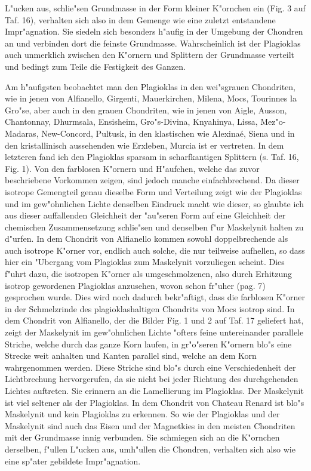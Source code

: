 \documentclass[a4paper, 11pt, oneside, polutonikogreek, german]{article}
\begin{document}
L"ucken aus, schlie"sen Grundmasse in der Form kleiner K"ornchen ein (Fig. 3 auf Taf. 16), verhalten sich also in dem Gemenge wie eine zuletzt entstandene Impr"agnation. Sie siedeln sich besonders h"aufig in der Umgebung der Chondren an und verbinden dort die feinste Grundmasse. Wahrscheinlich ist der Plagioklas auch unmerklich zwischen den K"ornern und Splittern der Grundmasse verteilt und bedingt zum Teile die Festigkeit des Ganzen.

Am h"aufigsten beobachtet man den Plagioklas in den wei"sgrauen Chondriten, wie in jenen von Alfianello, Girgenti, Mauerkirchen, Milena, Mocs, Tourinnes la Gro"se, aber auch in den grauen Chondriten, wie in jenen von Aigle, Ausson, Chantonnay, Dhurmsala, Ensisheim, Gro"s-Divina, Knyahinya, Lissa, Mez"o-Madaras, New-Concord, Pultusk, in den klastischen wie Alexinaé, Siena und in den kristallinisch aussehenden wie Erxleben, Murcia ist er vertreten. In dem letzteren fand ich den Plagioklas sparsam in scharfkantigen Splittern (s. Taf. 16, Fig. 1). Von den farblosen K"ornern und H"aufchen, welche das zuvor beschriebene Vorkommen zeigen, sind jedoch manche einfachbrechend. Da dieser isotrope Gemengteil genau dieselbe Form und Verteilung zeigt wie der Plagioklas und im gew"ohnlichen Lichte denselben Eindruck macht wie dieser, so glaubte ich aus dieser auffallenden Gleichheit der "au"seren Form auf eine Gleichheit der chemischen Zusammensetzung schlie"sen und denselben f"ur Maskelynit halten zu d"urfen. In dem Chondrit von Alfianello kommen sowohl doppelbrechende als auch isotrope K"orner vor, endlich auch solche, die nur teilweise aufhellen, so dass hier ein "Ubergang vom Plagioklas zum Maskelynit vorzuliegen scheint. Dies f"uhrt dazu, die isotropen K"orner als umgeschmolzenen, also durch Erhitzung isotrop gewordenen Plagioklas anzusehen, wovon schon fr"uher (pag. 7) gesprochen wurde. Dies wird noch dadurch bekr"aftigt, dass die farblosen K"orner in der Schmelzrinde des plagioklashaltigen Chondrits von Mocs isotrop sind. In dem Chondrit von Alfianello, der die Bilder Fig. 1 und 2 auf Taf. 17 geliefert hat, zeigt der Maskelynit im gew"ohnlichen Lichte "ofters feine untereinander parallele Striche, welche durch das ganze Korn laufen, in gr"o"seren K"ornern blo"s eine Strecke weit anhalten und Kanten parallel sind, welche an dem Korn wahrgenommen werden. Diese Striche sind blo"s durch eine Verschiedenheit der Lichtbrechung hervorgerufen, da sie nicht bei jeder Richtung des durchgehenden Lichtes auftreten. Sie erinnern an die Lamellierung im Plagioklas. Der Maskelynit ist viel seltener als der Plagioklas. In dem Chondrit von Chateau Renard ist blo"s Maskelynit und kein Plagioklas zu erkennen. So wie der Plagioklas und der Maskelynit sind auch das Eisen und der Magnetkies in den meisten Chondriten mit der Grundmasse innig verbunden. Sie schmiegen sich an die K"ornchen derselben, f"ullen L"ucken aus, umh"ullen die Chondren, verhalten sich also wie eine sp"ater gebildete Impr"agnation.
\end{document}
